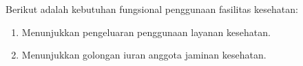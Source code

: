 Berikut adalah kebutuhan fungsional penggunaan fasilitas kesehatan:
\begin{enumerate}
	\item Menunjukkan pengeluaran penggunaan layanan kesehatan.
	\item Menunjukkan golongan iuran anggota jaminan kesehatan.
\end{enumerate}